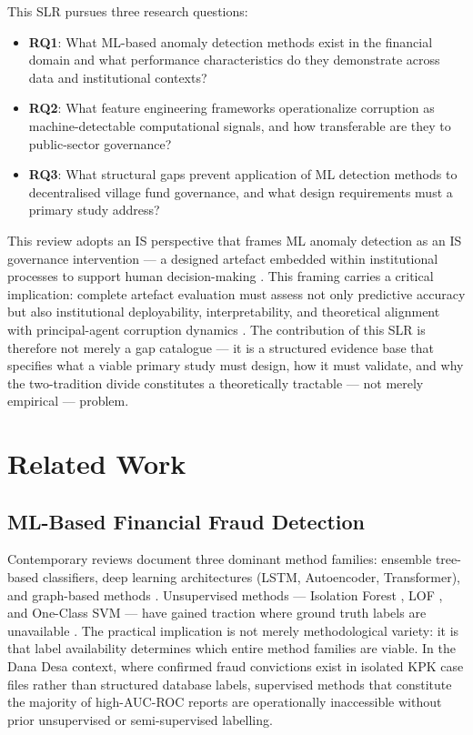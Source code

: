 \documentclass[3p,times,procedia]{elsarticle}
\begin{document}
This SLR pursues three research questions:
\begin{itemize}
\item \textbf{RQ1}: What ML-based anomaly detection methods exist in the financial domain
and what performance characteristics do they demonstrate across data and institutional
contexts?
\item \textbf{RQ2}: What feature engineering frameworks operationalize corruption as
machine-detectable computational signals, and how transferable are they to public-sector
governance?
\item \textbf{RQ3}: What structural gaps prevent application of ML detection methods to
decentralised village fund governance, and what design requirements must a primary study
address?
\end{itemize}

This review adopts an IS perspective that frames ML anomaly detection as an IS governance
intervention --- a designed artefact embedded within institutional processes to support
human decision-making \cite{method_hevner2004}. This framing carries a critical
implication: complete artefact evaluation must assess not only predictive accuracy but
also institutional deployability, interpretability, and theoretical alignment with
principal-agent corruption dynamics \cite{method_jensen1976}. The contribution of this
SLR is therefore not merely a gap catalogue --- it is a structured evidence base that
specifies what a viable primary study must design, how it must validate, and why the
two-tradition divide constitutes a theoretically tractable --- not merely empirical ---
problem.

\section{Related Work}
\label{sec:related}

\subsection{ML-Based Financial Fraud Detection}

Contemporary reviews document three dominant method families: ensemble tree-based
classifiers, deep learning architectures (LSTM, Autoencoder, Transformer), and
graph-based methods \cite{p001,p003,p004,p022,p037}. Unsupervised methods --- Isolation
Forest \cite{p015}, LOF \cite{p041}, and One-Class SVM --- have gained traction where
ground truth labels are unavailable \cite{p003,p015,p041}. The practical implication is
not merely methodological variety: it is that label availability determines which entire
method families are viable. In the Dana Desa context, where confirmed fraud convictions
exist in isolated KPK case files rather than structured database labels, supervised methods
that constitute the majority of high-AUC-ROC reports \cite{p003,p007,p022,p026,p039}
are operationally inaccessible without prior unsupervised or semi-supervised labelling.
\end{document}
